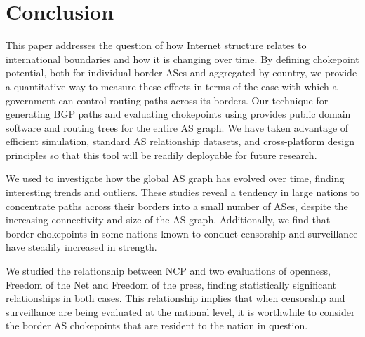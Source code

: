 \section{Conclusion}
This paper addresses the question of how Internet structure relates to 
international boundaries and how it is changing over time.  By defining chokepoint
potential, both for individual border ASes and aggregated by country,
we provide a quantitative way to measure these effects in terms of the ease
with which a government can control routing paths across its borders. 
Our technique for generating BGP paths and evaluating chokepoints
using \toolname{} provides public domain software and routing trees for the entire AS graph.
We have taken advantage of efficient simulation, standard AS relationship datasets, and cross-platform
design principles so that this tool will be readily deployable for future research.
\par We used \toolname{} to investigate how the global AS graph has
evolved over time, finding interesting trends and outliers. These
studies reveal a tendency in large nations to concentrate paths across
their borders into a small number of ASes, despite the increasing
connectivity and size of the AS graph. Additionally, we find that border
chokepoints in some nations known to conduct censorship and
surveillance have steadily increased in strength.
\par
We studied the relationship between NCP and two evaluations of openness, Freedom of the Net  and Freedom of the press, finding statistically significant relationships in both cases.
This relationship implies that when censorship and surveillance are
being evaluated at the national level, it is worthwhile to consider
the border AS chokepoints that are resident to the nation in question.

